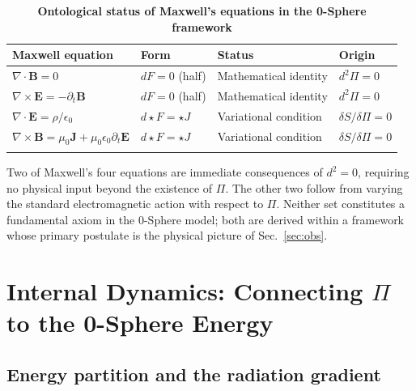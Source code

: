 \documentclass[%
 reprint, amsmath,amssymb, aps, prb, ]{revtex4-2}
\numberwithin{equation}{section}
\newcommand{\hodge}{\star}
\begin{document}
\begin{table}[t!]
\centering
\caption{\textbf{Ontological status of Maxwell's equations in the 0-Sphere framework}}
\label{tab:maxwell_origin}
\renewcommand{\arraystretch}{1.4}
\begin{tabular}{p{6.0cm}p{2.8cm}p{3.2cm}p{3.5cm}}
\toprule
\textbf{Maxwell equation} & \textbf{Form} & \textbf{Status} & \textbf{Origin} \\
\midrule
$\nabla\cdot\mathbf{B} = 0$
& $dF=0$ (half)
& Mathematical identity
& $d^2\Pi = 0$ \\
\addlinespace[0.3cm]
$\nabla\times\mathbf{E} = -\partial_t\mathbf{B}$
& $dF=0$ (half)
& Mathematical identity
& $d^2\Pi = 0$ \\
\addlinespace[0.3cm]
$\nabla\cdot\mathbf{E} = \rho/\epsilon_0$
& $d{\hodge}F = {\hodge}J$
& Variational condition
& $\delta S/\delta\Pi = 0$ \\
\addlinespace[0.3cm]
$\nabla\times\mathbf{B} = \mu_0\mathbf{J}+\mu_0\epsilon_0\partial_t\mathbf{E}$
& $d{\hodge}F = {\hodge}J$
& Variational condition
& $\delta S/\delta\Pi = 0$ \\
\addlinespace[0.2cm]
\bottomrule
\end{tabular}
\vspace{0.2cm}
\begin{minipage}{0.95\textwidth}
\justifying\footnotesize
Two of Maxwell's four equations are immediate consequences of $d^2=0$, requiring no physical input beyond the existence of $\Pi$. The other two follow from varying the standard electromagnetic action with respect to $\Pi$. Neither set constitutes a fundamental axiom in the 0-Sphere model; both are derived within a framework whose primary postulate is the physical picture of Sec.~\ref{sec:obs}.
\end{minipage}
\end{table}

\section{Internal Dynamics: Connecting $\Pi$ to the 0-Sphere Energy}
\label{sec:dynamics}

\subsection{Energy partition and the radiation gradient}
\end{document}

